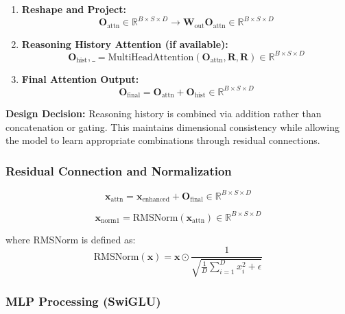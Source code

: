 \documentclass{article}
\begin{document}
\begin{enumerate}
\item \textbf{Reshape and Project:}
\begin{equation}
\mathbf{O}_{\text{attn}} \in \mathbb{R}^{B \times S \times D} \rightarrow \mathbf{W}_{\text{out}} \mathbf{O}_{\text{attn}} \in \mathbb{R}^{B \times S \times D}
\end{equation}

\item \textbf{Reasoning History Attention (if available):}
\begin{equation}
\mathbf{O}_{\text{hist}}, \_ = \text{MultiHeadAttention}(\mathbf{O}_{\text{attn}}, \mathbf{R}, \mathbf{R}) \in \mathbb{R}^{B \times S \times D}
\end{equation}

\item \textbf{Final Attention Output:}
\begin{equation}
\mathbf{O}_{\text{final}} = \mathbf{O}_{\text{attn}} + \mathbf{O}_{\text{hist}} \in \mathbb{R}^{B \times S \times D}
\end{equation}
\end{enumerate}

\textbf{Design Decision:} Reasoning history is combined via addition rather than concatenation or gating. This maintains dimensional consistency while allowing the model to learn appropriate combinations through residual connections.

\subsubsection{Residual Connection and Normalization}

\begin{equation}
\mathbf{x}_{\text{attn}} = \mathbf{x}_{\text{enhanced}} + \mathbf{O}_{\text{final}} \in \mathbb{R}^{B \times S \times D}
\end{equation}

\begin{equation}
\mathbf{x}_{\text{norm1}} = \text{RMSNorm}(\mathbf{x}_{\text{attn}}) \in \mathbb{R}^{B \times S \times D}
\end{equation}

where RMSNorm is defined as:
\begin{equation}
\text{RMSNorm}(\mathbf{x}) = \mathbf{x} \odot \frac{1}{\sqrt{\frac{1}{D}\sum_{i=1}^{D} x_i^2 + \epsilon}}
\end{equation}

\subsubsection{MLP Processing (SwiGLU)}
\end{document}
